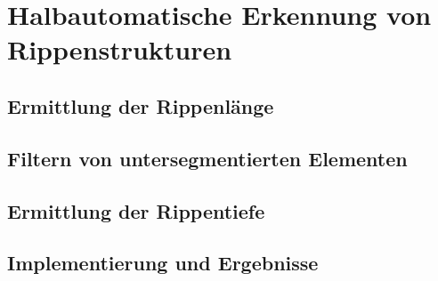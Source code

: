 \chapter{Halbautomatische Erkennung von Rippenstrukturen}
\label{cha:psoDomes}
	

\section{Ermittlung der Rippenlänge}

\section{Filtern von untersegmentierten Elementen}

\section{Ermittlung der Rippentiefe}

\section{Implementierung und Ergebnisse}